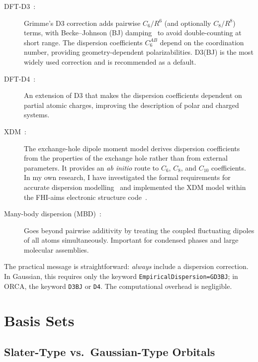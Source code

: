 \documentclass[11pt]{article}
\numberwithin{equation}{section}
\begin{document}
\begin{description}
\item[DFT-D3~\cite{GrimmeD3}:] Grimme's D3 correction adds pairwise $C_6/R^6$ (and optionally $C_8/R^8$) terms, with Becke--Johnson (BJ) damping~\cite{GrimmeD3BJ} to avoid double-counting at short range. The dispersion coefficients $C_6^{AB}$ depend on the coordination number, providing geometry-dependent polarizabilities. D3(BJ) is the most widely used correction and is recommended as a default.

\item[DFT-D4~\cite{GrimmeD4}:] An extension of D3 that makes the dispersion coefficients dependent on partial atomic charges, improving the description of polar and charged systems.

\item[XDM~\cite{BeckeJohnson2005,PriceXDM2023}:] The exchange-hole dipole moment model derives dispersion coefficients from the properties of the exchange hole rather than from external parameters. It provides an \emph{ab initio} route to $C_6$, $C_8$, and $C_{10}$ coefficients. In my own research, I have investigated the formal requirements for accurate dispersion modelling~\cite{PriceDispersion2021} and implemented the XDM model within the FHI-aims electronic structure code~\cite{PriceXDM2023}.

\item[Many-body dispersion (MBD)~\cite{TkatchenkoScheffler2012}:] Goes beyond pairwise additivity by treating the coupled fluctuating dipoles of all atoms simultaneously. Important for condensed phases and large molecular assemblies.
\end{description}

The practical message is straightforward: \emph{always} include a dispersion correction. In Gaussian, this requires only the keyword \texttt{EmpiricalDispersion=GD3BJ}; in ORCA, the keyword \texttt{D3BJ} or \texttt{D4}. The computational overhead is negligible.


\section{Basis Sets}
\label{sec:basis}

\subsection{Slater-Type vs.\ Gaussian-Type Orbitals}
\end{document}
